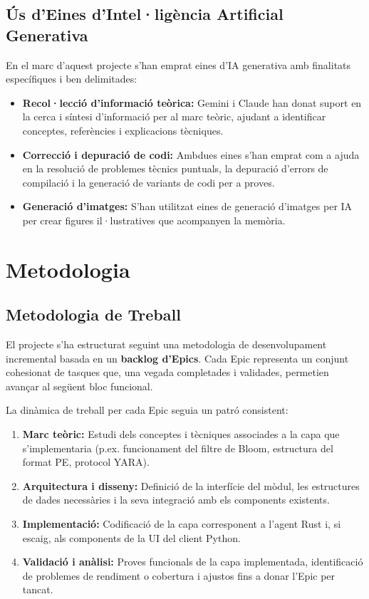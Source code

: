 \documentclass[12pt,a4paper]{report}
\begin{document}
\section{Ús d'Eines d'Intel·ligència Artificial Generativa}
En el marc d'aquest projecte s'han emprat eines d'IA generativa amb finalitats específiques i ben delimitades:

\begin{itemize}
    \item \textbf{Recol·lecció d'informació teòrica:} Gemini i Claude han donat suport en la cerca i síntesi d'informació per al marc teòric, ajudant a identificar conceptes, referències i explicacions tècniques.
    \item \textbf{Correcció i depuració de codi:} Ambdues eines s'han emprat com a ajuda en la resolució de problemes tècnics puntuals, la depuració d'errors de compilació i la generació de variants de codi per a proves.
    \item \textbf{Generació d'imatges:} S'han utilitzat eines de generació d'imatges per IA per crear figures il·lustratives que acompanyen la memòria.
\end{itemize}


\chapter{Metodologia}
\label{ch:metodologia}

\section{Metodologia de Treball}
El projecte s'ha estructurat seguint una metodologia de desenvolupament incremental basada en un \textbf{backlog d'Epics}. Cada Epic representa un conjunt cohesionat de tasques que, una vegada completades i validades, permetien avançar al següent bloc funcional.

La dinàmica de treball per cada Epic seguia un patró consistent:
\begin{enumerate}
    \item \textbf{Marc teòric:} Estudi dels conceptes i tècniques associades a la capa que s'implementaria (p.ex. funcionament del filtre de Bloom, estructura del format PE, protocol YARA).
    \item \textbf{Arquitectura i disseny:} Definició de la interfície del mòdul, les estructures de dades necessàries i la seva integració amb els components existents.
    \item \textbf{Implementació:} Codificació de la capa corresponent a l'agent Rust i, si escaig, als components de la UI del client Python.
    \item \textbf{Validació i anàlisi:} Proves funcionals de la capa implementada, identificació de problemes de rendiment o cobertura i ajustos fins a donar l'Epic per tancat.
\end{enumerate}
\end{document}
